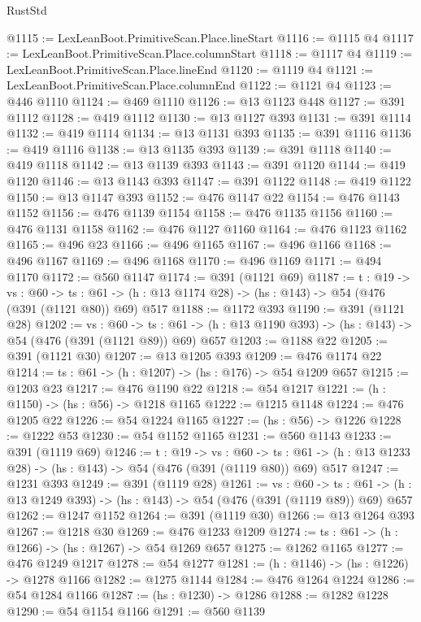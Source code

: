 \begin{lexlean}{RustStd}
\begin{coremodule}
@1115 := LexLeanBoot.PrimitiveScan.Place.lineStart
@1116 := @1115 @4
@1117 := LexLeanBoot.PrimitiveScan.Place.columnStart
@1118 := @1117 @4
@1119 := LexLeanBoot.PrimitiveScan.Place.lineEnd
@1120 := @1119 @4
@1121 := LexLeanBoot.PrimitiveScan.Place.columnEnd
@1122 := @1121 @4
@1123 := @446 @1110
@1124 := @469 @1110
@1126 := @13 @1123 @448
@1127 := @391 @1112
@1128 := @419 @1112
@1130 := @13 @1127 @393
@1131 := @391 @1114
@1132 := @419 @1114
@1134 := @13 @1131 @393
@1135 := @391 @1116
@1136 := @419 @1116
@1138 := @13 @1135 @393
@1139 := @391 @1118
@1140 := @419 @1118
@1142 := @13 @1139 @393
@1143 := @391 @1120
@1144 := @419 @1120
@1146 := @13 @1143 @393
@1147 := @391 @1122
@1148 := @419 @1122
@1150 := @13 @1147 @393
@1152 := @476 @1147 @22
@1154 := @476 @1143 @1152
@1156 := @476 @1139 @1154
@1158 := @476 @1135 @1156
@1160 := @476 @1131 @1158
@1162 := @476 @1127 @1160
@1164 := @476 @1123 @1162
@1165 := @496 @23
@1166 := @496 @1165
@1167 := @496 @1166
@1168 := @496 @1167
@1169 := @496 @1168
@1170 := @496 @1169
@1171 := @494 @1170
@1172 := @560 @1147
@1174 := @391 (@1121 @69)
@1187 := {t : @19} ->
  {vs : @60} ->
  {ts : @61} -> (h : @13 @1174 @28) -> (hs : @143) -> @54 (@476 (@391 (@1121 @80)) @69) @517
@1188 := @1172 @393
@1190 := @391 (@1121 @28)
@1202 := {vs : @60} ->
  {ts : @61} -> (h : @13 @1190 @393) -> (hs : @143) -> @54 (@476 (@391 (@1121 @89)) @69) @657
@1203 := @1188 @22
@1205 := @391 (@1121 @30)
@1207 := @13 @1205 @393
@1209 := @476 @1174 @22
@1214 := {ts : @61} -> (h : @1207) -> (hs : @176) -> @54 @1209 @657
@1215 := @1203 @23
@1217 := @476 @1190 @22
@1218 := @54 @1217
@1221 := (h : @1150) -> (hs : @56) -> @1218 @1165
@1222 := @1215 @1148
@1224 := @476 @1205 @22
@1226 := @54 @1224 @1165
@1227 := (hs : @56) -> @1226
@1228 := @1222 @53
@1230 := @54 @1152 @1165
@1231 := @560 @1143
@1233 := @391 (@1119 @69)
@1246 := {t : @19} ->
  {vs : @60} ->
  {ts : @61} -> (h : @13 @1233 @28) -> (hs : @143) -> @54 (@476 (@391 (@1119 @80)) @69) @517
@1247 := @1231 @393
@1249 := @391 (@1119 @28)
@1261 := {vs : @60} ->
  {ts : @61} -> (h : @13 @1249 @393) -> (hs : @143) -> @54 (@476 (@391 (@1119 @89)) @69) @657
@1262 := @1247 @1152
@1264 := @391 (@1119 @30)
@1266 := @13 @1264 @393
@1267 := @1218 @30
@1269 := @476 @1233 @1209
@1274 := {ts : @61} -> (h : @1266) -> (hs : @1267) -> @54 @1269 @657
@1275 := @1262 @1165
@1277 := @476 @1249 @1217
@1278 := @54 @1277
@1281 := (h : @1146) -> (hs : @1226) -> @1278 @1166
@1282 := @1275 @1144
@1284 := @476 @1264 @1224
@1286 := @54 @1284 @1166
@1287 := (hs : @1230) -> @1286
@1288 := @1282 @1228
@1290 := @54 @1154 @1166
@1291 := @560 @1139

\end{coremodule}
\end{lexlean}
